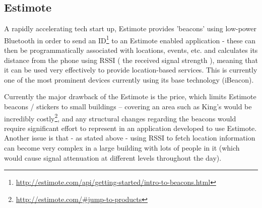 \documentclass[11pt]{informatics-report}
\begin{document}
\subsection{Estimote}

A rapidly accelerating tech start up, Estimote provides 'beacons' using low-power Bluetooth in order to send an ID\footnote{\url{http://estimote.com/api/getting-started/intro-to-beacons.html}} to an Estimote enabled application - these can then be programmatically associated with locations, events, etc. and calculates its distance from the phone using RSSI ( the received signal strength ), meaning that it can be used very effectively to provide location-based services. This is currently one of the most prominent devices currently using its base technology (iBeacon). 

Currently the major drawback of the Estimote is the price, which limits Estimote beacons / stickers to small buildings – covering an area such as King’s would be incredibly costly\footnote{\url{http://estimote.com/#jump-to-products}}, and any structural changes regarding the beacons would require significant effort to represent in an application developed to use Estimote. Another issue is that - as stated above - using RSSI to fetch location information can become very complex in a large building with lots of people in it (which would cause signal attenuation at different levels throughout the day). 













\appendix



\end{document}

